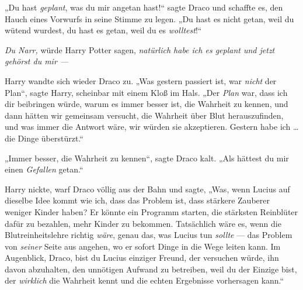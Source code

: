 „Du hast \emph{geplant}, was du mir angetan hast!“ sagte Draco und schaffte es, den Hauch eines Vorwurfs in seine Stimme zu legen.
„Du hast es nicht getan, weil du wütend wurdest, du hast es getan, weil du es \emph{wolltest}!“

\emph{Du Narr,} würde Harry Potter sagen, \emph{natürlich habe ich es geplant und jetzt gehörst du mir —}

Harry wandte sich wieder Draco zu.
„Was gestern passiert ist, war \emph{nicht} der Plan“, sagte Harry, scheinbar mit einem Kloß im Hals.
„Der \emph{Plan} war, dass ich dir beibringen würde, warum es immer besser ist, die Wahrheit zu kennen, und dann hätten wir gemeinsam versucht, die Wahrheit über Blut herauszufinden, und was immer die Antwort wäre, wir würden sie akzeptieren. Gestern habe ich … die Dinge überstürzt.“

„Immer besser, die Wahrheit zu kennen“, sagte Draco kalt.
„Als hättest du mir einen \emph{Gefallen} getan.“

Harry nickte, warf Draco völlig aus der Bahn und sagte,
„Was, wenn Lucius auf dieselbe Idee kommt wie ich, dass das Problem ist, dass stärkere Zauberer weniger Kinder haben? Er könnte ein Programm starten, die stärksten Reinblüter dafür zu bezahlen, mehr Kinder zu bekommen. Tatsächlich wäre es, wenn die Blutreinheitslehre richtig \emph{wäre}, genau das, was Lucius tun \emph{sollte} — das Problem von \emph{seiner} Seite aus angehen, wo er sofort Dinge in die Wege leiten kann. Im Augenblick, Draco, bist du Lucius einziger Freund, der versuchen würde, ihn davon abzuhalten, den unnötigen Aufwand zu betreiben, weil du der Einzige bist, der \emph{wirklich} die Wahrheit kennt und die echten Ergebnisse vorhersagen kann.“

